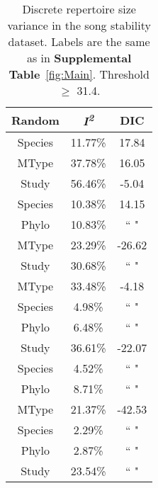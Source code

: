 \documentclass{article}
\begin{document}
  \begin{table}[H]
  \centering
  \caption{Discrete repertoire size variance in the song stability dataset. Labels are the same as in \textbf{Supplemental Table}~\ref{fig:Main}. Threshold $\ge$ 31.4.} 
  \begin{tabular}{ccc}
  \hline
  Random & \textit{I\textsuperscript{2}} & DIC \\ 
  \hline
  Species & 11.77\% & 17.84 \\ \hdashline
  MType & 37.78\% & 16.05 \\ \hdashline
  Study & 56.46\% & -5.04 \\ \hdashline
  Species & 10.38\% & 14.15 \\ 
  Phylo & 10.83\% & `` " \\ \hdashline
  MType & 23.29\% & -26.62 \\ 
  Study & 30.68\% & `` " \\ \hdashline
  MType & 33.48\% & -4.18 \\ 
  Species & 4.98\% & `` " \\ 
  Phylo & 6.48\% & `` " \\ \hdashline
  Study & 36.61\% & -22.07 \\ 
  Species & 4.52\% & `` " \\ 
  Phylo & 8.71\% & `` " \\ \hdashline
  MType & 21.37\% & -42.53 \\ 
  Species & 2.29\% & `` " \\ 
  Phylo & 2.87\% & `` " \\ 
  Study & 23.54\% & `` " \\ 
  \hline
  \end{tabular}
  \end{table}
\end{document}
